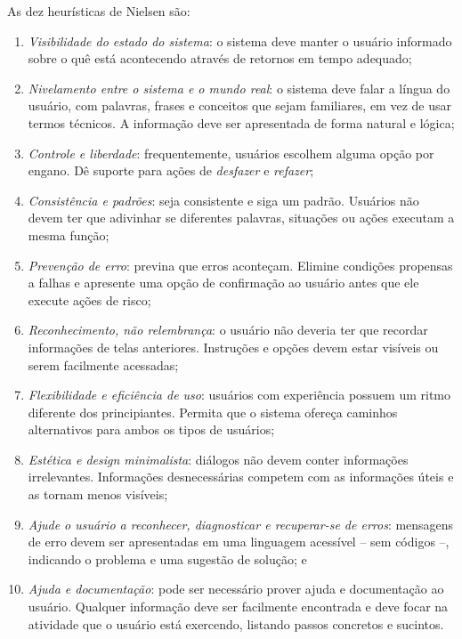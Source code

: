 As dez heurísticas de Nielsen são:
\begin{enumerate}
	\item \textit{Visibilidade do estado do sistema}: o sistema deve manter o usuário informado sobre o quê está acontecendo através de retornos em tempo adequado;
	\item \textit{Nivelamento entre o sistema e o mundo real}: o sistema deve falar a língua do usuário, com palavras, frases e conceitos que sejam familiares, em vez de usar termos técnicos. A informação deve ser apresentada de forma natural e lógica;
	\item \textit{Controle e liberdade}: frequentemente, usuários escolhem alguma opção por engano. Dê suporte para ações de \emph{desfazer} e \emph{refazer};
	\item \textit{Consistência e padrões}: seja consistente e siga um padrão. Usuários não devem ter que adivinhar se diferentes palavras, situações ou ações executam a mesma função;
	\item \textit{Prevenção de erro}: previna que erros aconteçam. Elimine condições propensas a falhas e apresente uma opção de confirmação ao usuário antes que ele execute ações de risco;
	\item \textit{Reconhecimento, não relembrança}: o usuário não deveria ter que recordar informações de telas anteriores. Instruções e opções devem estar visíveis ou serem facilmente acessadas;
	\item \textit{Flexibilidade e eficiência de uso}: usuários com experiência possuem um ritmo diferente dos principiantes. Permita que o sistema ofereça caminhos alternativos para ambos os tipos de usuários;
	\item \textit{Estética e design minimalista}: diálogos não devem conter informações irrelevantes. Informações desnecessárias competem com as informações úteis e as tornam menos visíveis;
	\item \textit{Ajude o usuário a reconhecer, diagnosticar e recuperar-se de erros}: mensagens de erro devem ser apresentadas em uma linguagem acessível -- sem códigos --, indicando o problema e uma sugestão de solução; e
	\item \textit{Ajuda e documentação}: pode ser necessário prover ajuda e documentação ao usuário. Qualquer informação deve ser facilmente encontrada e deve focar na atividade que o usuário está exercendo, listando passos concretos e sucintos.
\end{enumerate}

